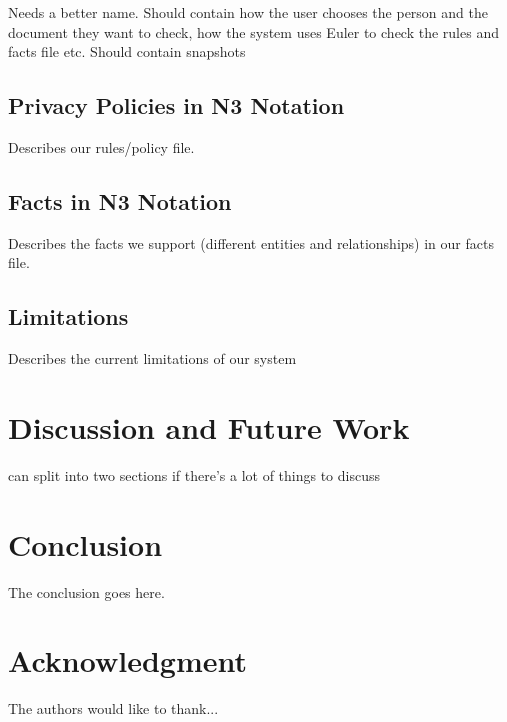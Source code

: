 \documentclass[conference]{IEEEtran}
\begin{document}
Needs a better name. Should contain how the user chooses the person and the document they want to check, how the system uses Euler to check the rules and facts file etc. Should contain snapshots

\subsection{Privacy Policies in N3 Notation}
\label{rules-sec}

Describes our rules/policy file. 

\subsection{Facts in N3 Notation}

Describes the facts we support (different entities and relationships) in our facts file.

\subsection{Limitations}

Describes the current limitations of our system

\section{Discussion and Future Work}
\label{discFuture}

can split into two sections if there's a lot of things to discuss


\section{Conclusion}
\label{concl}
The conclusion goes here.






\section*{Acknowledgment}


The authors would like to thank...











\end{document}
